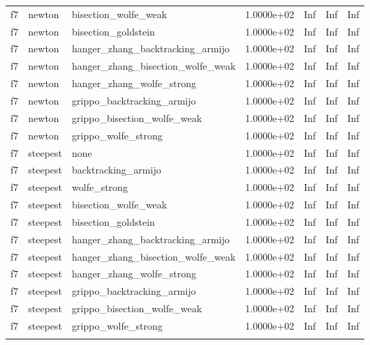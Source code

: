 \documentclass[a4paper,11pt]{article}
\numberwithin{equation}{section} %
\begin{document}
\begin{longtable}{p{1.5cm}|p{1.5cm}|p{4cm}|p{2cm}|p{2cm}|p{2cm}|p{2cm}}
        f7 & newton & bisection\_wolfe\_weak & 1.0000e+02 & Inf & Inf & Inf \\
        f7 & newton & bisection\_goldstein & 1.0000e+02 & Inf & Inf & Inf \\
        f7 & newton & hanger\_zhang\_backtracking\_armijo & 1.0000e+02 & Inf & Inf & Inf \\
        f7 & newton & hanger\_zhang\_bisection\_wolfe\_weak & 1.0000e+02 & Inf & Inf & Inf \\
        f7 & newton & hanger\_zhang\_wolfe\_strong & 1.0000e+02 & Inf & Inf & Inf \\
        f7 & newton & grippo\_backtracking\_armijo & 1.0000e+02 & Inf & Inf & Inf \\
        f7 & newton & grippo\_bisection\_wolfe\_weak & 1.0000e+02 & Inf & Inf & Inf \\
        f7 & newton & grippo\_wolfe\_strong & 1.0000e+02 & Inf & Inf & Inf \\
        f7 & steepest & none & 1.0000e+02 & Inf & Inf & Inf \\
        f7 & steepest & backtracking\_armijo & 1.0000e+02 & Inf & Inf & Inf \\
        f7 & steepest & wolfe\_strong & 1.0000e+02 & Inf & Inf & Inf \\
        f7 & steepest & bisection\_wolfe\_weak & 1.0000e+02 & Inf & Inf & Inf \\
        f7 & steepest & bisection\_goldstein & 1.0000e+02 & Inf & Inf & Inf \\
        f7 & steepest & hanger\_zhang\_backtracking\_armijo & 1.0000e+02 & Inf & Inf & Inf \\
        f7 & steepest & hanger\_zhang\_bisection\_wolfe\_weak & 1.0000e+02 & Inf & Inf & Inf \\
        f7 & steepest & hanger\_zhang\_wolfe\_strong & 1.0000e+02 & Inf & Inf & Inf \\
        f7 & steepest & grippo\_backtracking\_armijo & 1.0000e+02 & Inf & Inf & Inf \\
        f7 & steepest & grippo\_bisection\_wolfe\_weak & 1.0000e+02 & Inf & Inf & Inf \\
        f7 & steepest & grippo\_wolfe\_strong & 1.0000e+02 & Inf & Inf & Inf \\
    \label{table:simulation1}
\end{longtable}
\end{document}
